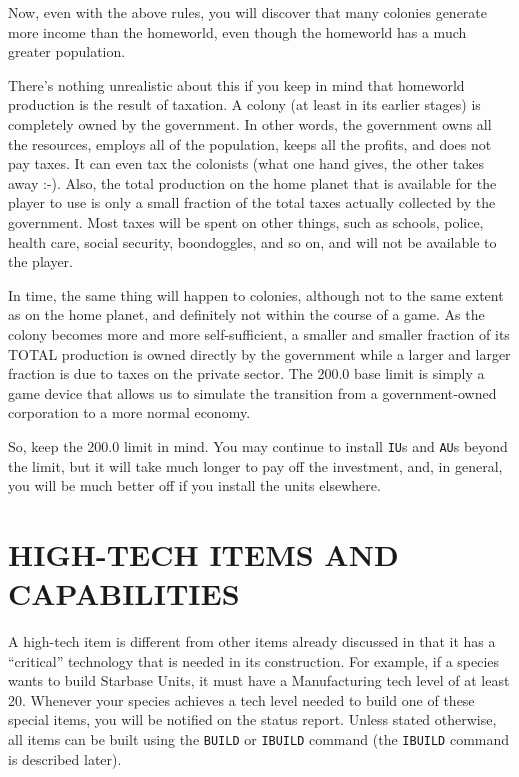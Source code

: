 \documentclass[10pt,titlepage]{article}
\begin{document}
Now, even with the above rules, you will discover that many colonies generate
more income than the homeworld, even though the homeworld has a much greater
population.

There's nothing unrealistic about this if you keep in mind that homeworld
production is the result of taxation.  A colony (at least in its earlier
stages) is completely owned by the government.  In other words, the government
owns all the resources, employs all of the population, keeps all the profits,
and does not pay taxes.  It can even tax the colonists (what one hand gives,
the other takes away :-).  Also, the total production on the home planet that
is available for the player to use is only a small fraction of the total taxes
actually collected by the government.  Most taxes will be spent on other
things, such as schools, police, health care, social security, boondoggles,
and so on, and will not be available to the player.

In time, the same thing will happen to colonies, although not to the same
extent as on the home planet, and definitely not within the course of a game.
As the colony becomes more and more self-sufficient, a smaller and smaller
fraction of its TOTAL production is owned directly by the government while a
larger and larger fraction is due to taxes on the private sector.  The 200.0
base limit is simply a game device that allows us to simulate the transition
from a government-owned corporation to a more normal economy.

So, keep the 200.0 limit in mind.  You may continue to install \texttt{IU}s and \texttt{AU}s
beyond the limit, but it will take much longer to pay off the investment, and,
in general, you will be much better off if you install the units elsewhere.




\appendix
\section{HIGH-TECH ITEMS AND CAPABILITIES}

A high-tech item is different from other items already discussed in that it has
a ``critical'' technology that is needed in its construction.  For example, if a
species wants to build Starbase Units, it must have a Manufacturing tech level
of at least 20.  Whenever your species achieves a tech level needed to build
one of these special items, you will be notified on the status report.  Unless
stated otherwise, all items can be built using the \texttt{BUILD} or \texttt{IBUILD} command
(the \texttt{IBUILD} command is described later).
\end{document}
